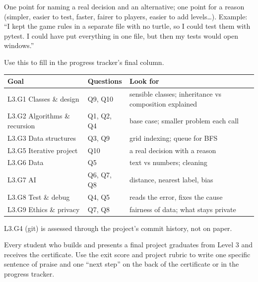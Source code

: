 \begin{answer}
One point for naming a real decision and an alternative; one point for a reason (simpler, easier
to test, faster, fairer to players, easier to add levels\ldots). Example: \enquote{I kept the game
rules in a separate file with no turtle, so I could test them with pytest. I could have put
everything in one file, but then my tests would open windows.}
\end{answer}

\begin{rubric}
Use this to fill in the progress tracker's final column.
\begin{center}
\renewcommand{\arraystretch}{1.25}
\begin{tabularx}{\linewidth}{@{}>{\raggedright\arraybackslash}p{4.6cm}>{\raggedright\arraybackslash}p{2.3cm}>{\raggedright\arraybackslash}X@{}}
\toprule
Goal & Questions & Look for\\ \midrule
L3.G1 Classes \& design & Q9, Q10 & sensible classes; inheritance vs composition explained\\
L3.G2 Algorithms \& recursion & Q1, Q2, Q4 & base case; smaller problem each call\\
L3.G3 Data structures & Q3, Q9 & grid indexing; queue for BFS\\
L3.G5 Iterative project & Q10 & a real decision with a reason\\
L3.G6 Data & Q5 & text vs numbers; cleaning\\
L3.G7 AI & Q6, Q7, Q8 & distance, nearest label, bias\\
L3.G8 Test \& debug & Q4, Q5 & reads the error, fixes the cause\\
L3.G9 Ethics \& privacy & Q7, Q8 & fairness of data; what stays private\\
\bottomrule
\end{tabularx}
\end{center}
L3.G4 (git) is assessed through the project's commit history, not on paper.
\end{rubric}

\begin{teachernote}
Every student who builds and presents a final project graduates from Level 3 and receives the
certificate. Use the exit score and project rubric to write one specific sentence of praise and
one \enquote{next step} on the back of the certificate or in the progress tracker.
\end{teachernote}
